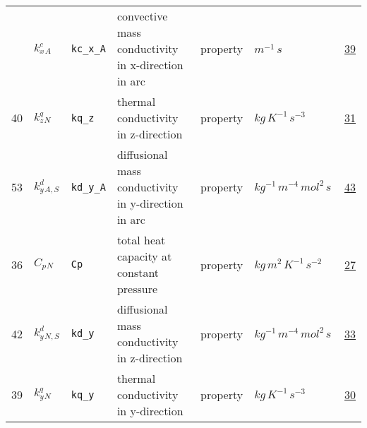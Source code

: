 \begin{longtable}{|p{1cm}|p{2.5cm}|p{4.5cm}|p{8cm}|p{3.0cm}|p{3cm}|p{1cm}|}
             & \hypertarget{"v:49"}{ $ {{k^c_x}}{_{A}} $}
             & \verb|kc_x_A|
             &  convective mass conductivity in x-direction in arc
             & \begin{lay}property \end{lay}
             & $ m^{-1} \,s \, $
             &                 \hyperlink{"e:39"}{ 39 }
                 \\
            40
             & \hypertarget{"v:40"}{ $ {{k^q_z}}{_{N}} $}
             & \verb|kq_z|
             & thermal conductivity in z-direction
             & \begin{lay}property \end{lay}
             & $ kg \,K^{-1} \,s^{-3} \, $
             &                 \hyperlink{"e:31"}{ 31 }
                 \\
            53
             & \hypertarget{"v:53"}{ $ {{k^d_y}}{_{A, S}} $}
             & \verb|kd_y_A|
             & diffusional mass conductivity in y-direction in arc
             & \begin{lay}property \end{lay}
             & $ kg^{-1} \,m^{-4} \,mol^{2} \,s \, $
             &                 \hyperlink{"e:43"}{ 43 }
                 \\
            36
             & \hypertarget{"v:36"}{ $ {{C_p}}{_{N}} $}
             & \verb|Cp|
             & total heat capacity at constant pressure
             & \begin{lay}property \end{lay}
             & $ kg \,m^{2} \,K^{-1} \,s^{-2} \, $
             &                 \hyperlink{"e:27"}{ 27 }
                 \\
            42
             & \hypertarget{"v:42"}{ $ {{k^d_y}}{_{N, S}} $}
             & \verb|kd_y|
             & diffusional mass conductivity in z-direction
             & \begin{lay}property \end{lay}
             & $ kg^{-1} \,m^{-4} \,mol^{2} \,s \, $
             &                 \hyperlink{"e:33"}{ 33 }
                 \\
            39
             & \hypertarget{"v:39"}{ $ {{k^q_y}}{_{N}} $}
             & \verb|kq_y|
             & thermal conductivity in y-direction
             & \begin{lay}property \end{lay}
             & $ kg \,K^{-1} \,s^{-3} \, $
             &                 \hyperlink{"e:30"}{ 30 }

\end{longtable}
